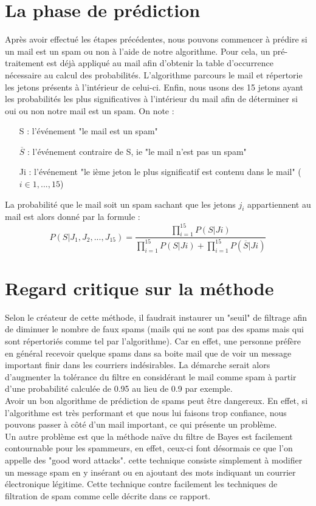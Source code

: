 \documentclass{article}
\begin{document}
\section{La phase de prédiction}

Après avoir effectué les étapes précédentes, nous pouvons commencer à prédire si un mail est un spam ou non à l'aide de notre algorithme. Pour cela, un pré-traitement est déjà appliqué au mail afin d'obtenir la table d’occurrence nécessaire au calcul des probabilités. L'algorithme parcours le mail et répertorie les jetons présents à l'intérieur de celui-ci. Enfin, nous usons des 15 jetons ayant les probabilités les plus significatives à l’intérieur du mail afin de déterminer si oui ou non notre mail est un spam. On note : 
\begin{itemize}
	\item[S] : l'événement "le mail est un spam"
	\item[$\overline{S}$] : l'événement contraire de S, ie "le mail n'est pas un spam"
	\item[Ji] : l'événement "le ième jeton le plus significatif est contenu dans le mail" ($i \in {1,...,15}$)
\end{itemize}
La probabilité que le mail soit un spam sachant que les jetons $j_i$ appartiennent au mail est alors donné par la formule :
\begin{equation}
P(S|J_1,J_2,...,J_15) = \frac{\prod_{i=1}^{15}P(S|Ji)}{\prod_{i=1}^{15}P(S|Ji)+\prod_{i=1}^{15}P(\overline{S}|Ji)}
\end{equation}
\section{Regard critique sur la méthode}

Selon le créateur de cette méthode, il faudrait instaurer un "seuil" de filtrage afin de diminuer le nombre de faux spams (mails qui ne sont pas des spams mais qui sont répertoriés comme tel par l'algorithme). Car en effet, une personne préfère en général recevoir quelque spams dans sa boite mail que de voir un message important finir dans les courriers indésirables. La démarche serait alors d'augmenter la tolérance du filtre en considérant le mail comme spam à partir d'une probabilité calculée de 0.95 au lieu de 0.9 par exemple.\\ 
Avoir un bon algorithme de prédiction de spams peut être dangereux. En effet, si l'algorithme est très performant et que nous lui faisons trop confiance, nous pouvons passer à côté d'un mail important, ce qui présente un problème.\\  Un autre problème  est que la méthode naïve du filtre de Bayes est facilement contournable pour les spammeurs, en effet, ceux-ci font désormais ce que l'on appelle des "good word attacks". cette technique consiste simplement à modifier un message spam en y insérant ou en ajoutant des mots indiquant un courrier électronique légitime. Cette technique contre facilement les techniques de filtration de spam comme celle décrite dans ce rapport.\\  
\end{document}
